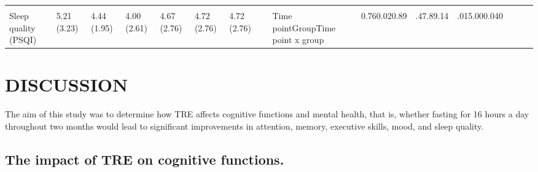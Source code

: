 \documentclass[authordate, empirical]{jote-new-article}
\begin{document}
\begin{table}
\begin{tabularx}{\linewidth}{@{} l l l l l l l l l l l l l l l @{}}
    \hline                                         &                                               &                      &                                   &                                   &               &                                       &   &  &  &  & \\

    Sleep quality (PSQI)                           & 5.21 (3.23)                                   & 4.44 (1.95)          & 4.00 (2.61)                       & 4.67 (2.76)
                                                   & 4.72 (2.76)                                   & 4.72 (2.76)          &                                   & Time pointGroupTime point x group & 0.760.020.89
                                                   & .47.89.14                                     & .015.000.040                                                                                                                                                        \\
  \end{tabularx}
\end{table}





\section{DISCUSSION }



The aim of this study was to determine how TRE affects cognitive functions and mental health, that is, whether fasting for 16 hours a day throughout two months would lead to significant improvements in attention, memory, executive skills, mood, and sleep quality.



\subsection{The impact of TRE on cognitive functions.}
\end{document}
